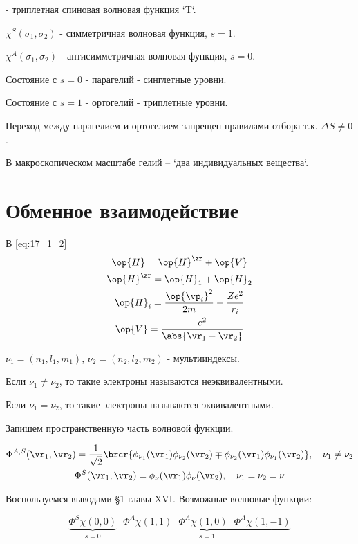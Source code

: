 - триплетная спиновая волновая функция `T`.

$\chi^S(\sigma_1, \sigma_2)$ - симметричная волновая функция, $s = 1$.

$\chi^A(\sigma_1, \sigma_2)$ - антисимметричная волновая функция, $s = 0$.

Состояние с $s = 0$ - парагелий - синглетные уровни.

Состояние с $s = 1$ - ортогелий - триплетные уровни.

Переход между парагелием и ортогелием запрещен правилами отбора т.к. $\Delta S \not = 0$.

В макроскопическом масштабе гелий -- `два индивидуальных вещества`.

\section{Обменное взаимодействие}

В \eqref{eq:17_1_2}
\begin{gather*}
\op{H} = \op{H}^\zr + \op{V} \\
\op{H}^\zr = \op{H}_1 + \op{H}_2 \\
\op{H}_i = \frac{\op{\vp_i}^2}{2m} - \frac{Ze^2}{r_i} \\
\op{V} = \frac{e^2}{\abs{\vr_1 - \vr_2}}
\end{gather*}

$\nu_1 = (n_1, l_1, m_1)$, $\nu_2 = (n_2, l_2, m_2)$ - мультииндексы.

Если $\nu_1 \not = \nu_2$, то такие электроны называются неэквивалентными.

Если $\nu_1 = \nu_2$, то такие электроны называются эквивалентными.

Запишем пространственную часть волновой функции.

\begin{gather}
\label{eq:17_2_1}
\Phi^{A, S}(\vr_1, \vr_2) = \frac{1}{\sqrt{2}}\brcr{\phi_{\nu_1}(\vr_1) \phi_{\nu_2}(\vr_2) \mp \phi_{\nu_2}(\vr_1) \phi_{\nu_1}(\vr_2)}, ~~~\nu_1 \not = \nu_2 \nonumber \\
\Phi^S(\vr_1, \vr_2) = \phi_{\nu}(\vr_1) \phi_{\nu}(\vr_2), ~~~\nu_1 = \nu_2= \nu
\end{gather}

Воспользуемся выводами \S 1 главы XVI. Возможные волновые функции:

\begin{equation}
\label{eq:17_2_2}
\underbrace{\Phi^S \chi(0, 0)}_{s = 0}~~~\underbrace{\Phi^A \chi(1,1)~~~\Phi^A \chi(1,0)~~~\Phi^A \chi(1,-1)}_{s = 1}
\end{equation}

